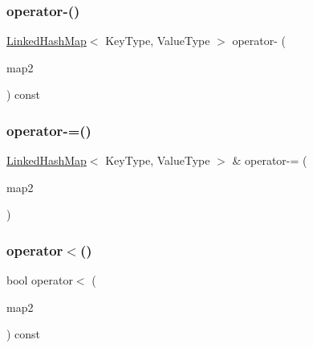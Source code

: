 \mbox{\label{classLinkedHashMap_aeb0ad54e8008a28ea0578ba8825a6e77}} 
\subsubsection{\texorpdfstring{operator-\/()}{operator-()}}
{\footnotesize\ttfamily \mbox{\hyperlink{classLinkedHashMap}{Linked\+Hash\+Map}}$<$ Key\+Type, Value\+Type $>$ operator-\/ (\begin{DoxyParamCaption}\item[{const \mbox{\hyperlink{classLinkedHashMap}{Linked\+Hash\+Map}}$<$ Key\+Type, Value\+Type $>$ \&}]{map2 }\end{DoxyParamCaption}) const}

\mbox{\label{classLinkedHashMap_af9f41a756eeffcfbb82c0801ddd1bb71}} 
\subsubsection{\texorpdfstring{operator-\/=()}{operator-=()}}
{\footnotesize\ttfamily \mbox{\hyperlink{classLinkedHashMap}{Linked\+Hash\+Map}}$<$ Key\+Type, Value\+Type $>$ \& operator-\/= (\begin{DoxyParamCaption}\item[{const \mbox{\hyperlink{classLinkedHashMap}{Linked\+Hash\+Map}}$<$ Key\+Type, Value\+Type $>$ \&}]{map2 }\end{DoxyParamCaption})}

\mbox{\label{classLinkedHashMap_a0943774682de2481db27e4469efb0eca}} 
\subsubsection{\texorpdfstring{operator$<$()}{operator<()}}
{\footnotesize\ttfamily bool operator$<$ (\begin{DoxyParamCaption}\item[{const \mbox{\hyperlink{classLinkedHashMap}{Linked\+Hash\+Map}}$<$ Key\+Type, Value\+Type $>$ \&}]{map2 }\end{DoxyParamCaption}) const}

